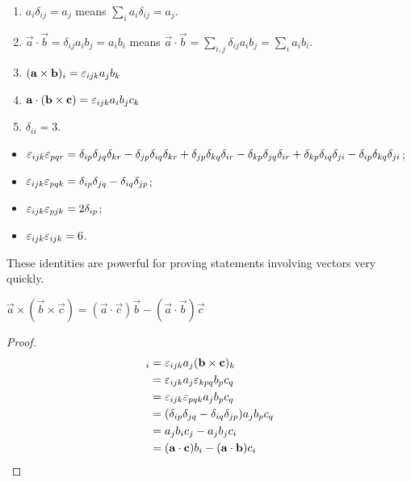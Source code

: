 \documentclass{../template/note}
\begin{document}
    \begin{example}
        \begin{enumerate}[label=\protect\circled{\arabic*}]
            \item \(a_i \delta_{ij} = a_j\) means \(\sum_i a_i \delta_{ij} = a_j\).
            \item \(\vec a \cdot \vec b = \delta_{ij} a_i b_j = a_ib_i\) means \(\vec a \cdot \vec b = \sum_{i,j} \delta_{ij} a_i b_j = \sum_i a_i b_i\).
            \item \((\vec a \times \vec b)_i = \lv{ijk} a_j b_k\)
            \item \(\vec a \cdot (\vec b \times \vec c) = \lv{ijk} a_i b_j c_k\)
            \item \(\delta_{ii} = 3\).
        \end{enumerate}
        
        
    \end{example}
    
    \begin{proposition}
        \begin{itemize}
            \item \(\varepsilon_{ijk} \varepsilon_{pqr} = \delta_{ip} \delta_{jq} \delta_{kr} - \delta_{jp} \delta_{iq} \delta_{kr} + \delta_{jp} \delta_{kq} \delta_{ir} - \delta_{kp} \delta_{jq} \delta_{ir} + \delta_{kp} \delta_{iq} \delta_{ji} - \delta_{ip} \delta_{kq} \delta_{ji}\);
            \item \(\varepsilon_{ijk}\varepsilon_{pqk} = \delta_{ip} \delta_{jq} - \delta_{iq} \delta_{jp}\);
            \item \(\varepsilon_{ijk} \varepsilon_{pjk} = 2 \delta_{ip}\);
            \item \(\varepsilon_{ijk} \varepsilon_{ijk} = 6\).
        \end{itemize}
    \end{proposition}

    These identities are powerful for proving statements involving vectors very quickly.
    
    \begin{proposition}
        \(\vec a \times (\vec b \times \vec c) = (\vec a \cdot \vec c) \vec b - (\vec a \cdot \vec b) \vec c\)
    \end{proposition}
    
    \begin{proof}
        \begin{align*}
            [\vec a \times (\vec b \times \vec c)]_i &= \lv{ijk} a_j (\vec b \times \vec c)_k \\
            &= \lv{ijk}a_j \lv{kpq} b_p c_q \\
            &= \lv{ijk} \lv{pqk} a_j b_p c_q \\
            &= (\delta_{ip} \delta_{jq} - \delta_{iq} \delta_{jp}) a_j b_p c_q \\
            &= a_j b_i c_j - a_j b_j c_i \\
            &= (\vec a \cdot \vec c) b_i - (\vec a \cdot \vec b) c_i \\
        \end{align*}

    \end{proof}
    
\end{document}
